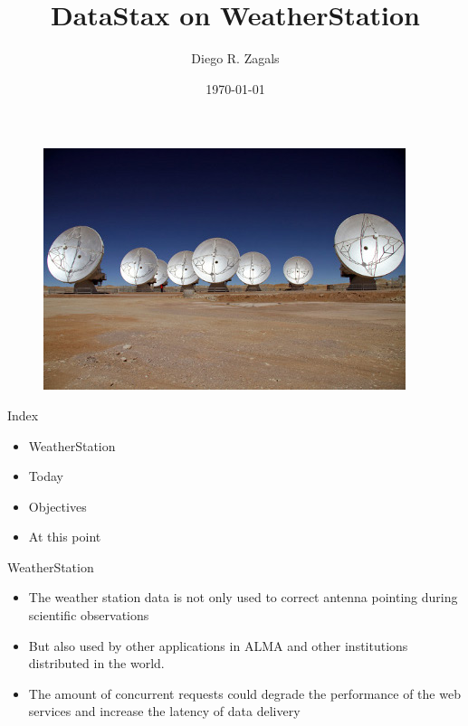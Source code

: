 \documentclass[12pt]{beamer}
\author{Diego R. Zagals}
\title{DataStax on WeatherStation}
\institute{El Atacama Large Millimeter/submillimeter Array }
\date{\today}
\begin{document}
\begin{frame}
\titlepage
\begin{figure}[Antennas]
\includegraphics[scale=0.5]{antennas.jpg} 
\label{Antennas}
\end{figure}
\end{frame}


\begin{frame}
\begin{block}{Index}
\begin{itemize}
\item WeatherStation
\item Today
\item Objectives
\item At this point
\end{itemize}
\end{block}
\end{frame}

\begin{frame}
\begin{block}{WeatherStation}
\begin{itemize}
\item The weather station data is not only used to correct antenna pointing during scientific observations
\item But also used by other applications in ALMA and other institutions distributed in the world. 
\item The amount of concurrent requests could degrade the performance of the web services and increase the latency of data delivery
\end{itemize}
\end{block}
\end{frame}
\end{document}
